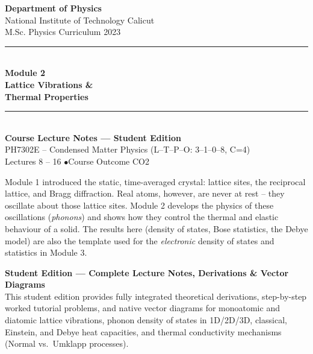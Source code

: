 \documentclass[11pt,a4paper]{article}
\begin{document}
\begin{titlepage}
\centering
\vspace*{1.2cm}
{\Large\bfseries Department of Physics}\\[2pt]
{\large National Institute of Technology Calicut}\\[6pt]
{\small M.Sc. Physics Curriculum 2023}\\[1.6cm]

{\color{ntccgold}\rule{0.65\linewidth}{1.2pt}}\\[10pt]
{\Huge\bfseries\color{ntccblue} Module 2}\\[8pt]
{\LARGE\bfseries Lattice Vibrations \&\\[2pt] Thermal Properties}\\[10pt]
{\color{ntccgold}\rule{0.65\linewidth}{1.2pt}}\\[1.2cm]

{\large\bfseries\color{ntccblue} Course Lecture Notes --- Student Edition}\\[4pt]
{\large PH7302E -- Condensed Matter Physics \quad (L--T--P--O: 3--1--0--8, C=4)}\\[4pt]
{\normalsize Lectures 8 -- 16 \quad$\bullet$\quad Course Outcome CO2}\\[2cm]

\begin{minipage}{0.82\linewidth}
\begin{keybox}
Module 1 introduced the static, time-averaged crystal: lattice sites, the reciprocal
lattice, and Bragg diffraction. Real atoms, however, are never at rest -- they oscillate
about those lattice sites. Module 2 develops the physics of these oscillations
(\emph{phonons}) and shows how they control the thermal and elastic behaviour of a solid.
The results here (density of states, Bose statistics, the Debye model) are also the
template used for the \emph{electronic} density of states and statistics in Module 3.
\end{keybox}
\end{minipage}

\vfill
\begin{tcolorbox}[colback=keybg, colframe=ntccblue, boxrule=0.6pt,
  arc=2pt, left=8pt, right=8pt, top=6pt, bottom=6pt, width=0.88\linewidth]
\textbf{Student Edition --- Complete Lecture Notes, Derivations \& Vector Diagrams}\\[3pt]
This student edition provides fully integrated theoretical derivations, step-by-step
worked tutorial problems, and native vector diagrams for monoatomic and diatomic lattice
vibrations, phonon density of states in 1D/2D/3D, classical, Einstein, and Debye heat capacities,
and thermal conductivity mechanisms (Normal vs.\ Umklapp processes).
\end{tcolorbox}
\end{titlepage}
\end{document}
